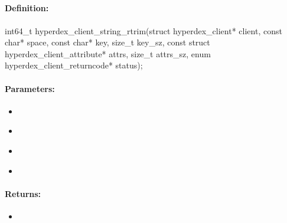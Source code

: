 \pagebreak
\subsection{}
\label{api:c:string_rtrim}


\paragraph{Definition:}
\begin{ccode}
int64_t hyperdex_client_string_rtrim(struct hyperdex_client* client,
        const char* space,
        const char* key, size_t key_sz,
        const struct hyperdex_client_attribute* attrs, size_t attrs_sz,
        enum hyperdex_client_returncode* status);
\end{ccode}

\paragraph{Parameters:}
\begin{itemize}[noitemsep]
\item {}\\

\item {}\\

\item {}\\

\item {}\\

\end{itemize}

\paragraph{Returns:}
\begin{itemize}[noitemsep]
\item {}\\

\end{itemize}

